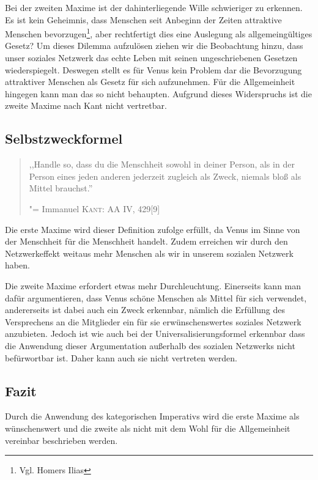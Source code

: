 Bei der zweiten Maxime ist der dahinterliegende Wille schwieriger zu
erkennen.  Es ist kein Geheimnis, dass Menschen seit Anbeginn der
Zeiten attraktive Menschen bevorzugen\footnote{Vgl. Homers Ilias},
aber rechtfertigt dies eine Auslegung als allgemeingültiges Gesetz?
Um dieses Dilemma aufzulösen ziehen wir die Beobachtung hinzu, dass
unser soziales Netzwerk das echte Leben mit seinen ungeschriebenen
Gesetzen wiederspiegelt.  Deswegen stellt es für Venus kein Problem
dar die Bevorzugung attraktiver Menschen als Gesetz für sich
aufzunehmen.  Für die Allgemeinheit hingegen kann man das so nicht
behaupten.  Aufgrund dieses Widerspruchs ist die zweite Maxime nach
Kant nicht vertretbar.

\subsection{Selbstzweckformel}

\begin{quote}

,,Handle so, dass du die Menschheit sowohl in deiner Person, als in der Person eines jeden anderen jederzeit zugleich als Zweck, niemals bloß als Mittel brauchst.''

"= Immanuel \textsc{Kant}: AA IV, 429[9]

\end{quote}

Die erste Maxime wird dieser Definition zufolge erfüllt, da Venus im
Sinne von der Menschheit für die Menschheit handelt.  Zudem erreichen
wir durch den Netzwerkeffekt weitaus mehr Menschen als wir in unserem
sozialen Netzwerk haben.

Die zweite Maxime erfordert etwas mehr Durchleuchtung.  Einerseits
kann man dafür argumentieren, dass Venus schöne Menschen als Mittel
für sich verwendet, andererseits ist dabei auch ein Zweck erkennbar,
nämlich die Erfüllung des Versprechens an die Mitglieder ein für sie
erwünschenswertes soziales Netzwerk anzubieten.  Jedoch ist wie auch
bei der Universalisierungsformel erkennbar dass die Anwendung dieser
Argumentation außerhalb des sozialen Netzwerks nicht befürwortbar
ist.  Daher kann auch sie nicht vertreten werden.

\subsection{Fazit}

Durch die Anwendung des kategorischen Imperativs wird die erste Maxime
als wünschenswert und die zweite als nicht mit dem Wohl für die
Allgemeinheit vereinbar beschrieben werden.
